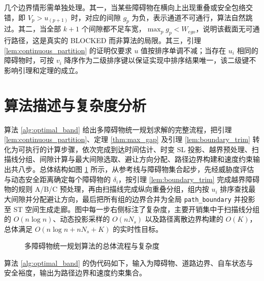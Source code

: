 几个边界情形需单独处理。其一，当某些障碍物在横向上出现重叠或安全包络交错，即 $V_p > u_{(p+1)}$ 时，对应的间隙 $g_p$ 为负，表示通道不可通行，算法自然跳过。其二，当全部 $k+1$ 个间隙都不足车宽，$\max_p g_p < W_{ego}$，说明该截面无可通行路径，这是真实的 BLOCKED 而非算法的局限。其三，引理 \ref{lem:continuous_partition} 的证明仅要求 $u$ 值按排序单调不减；当存在 $u_i$ 相同的障碍物时，可按 $v_i$ 降序作为二级排序键以保证实现中排序结果唯一，该二级键不影响引理和定理的成立。

\section{算法描述与复杂度分析}
算法 \ref{alg:optimal_band} 给出多障碍物统一规划求解的完整流程，把引理 \ref{lem:continuous_partition}、定理 \ref{thm:max_gap} 及引理 \ref{lem:boundary_trim} 转化为可执行的计算步骤，依次完成到达时间估计、时变 SL 投影、越界预处理、扫描线分组、间隙计算与最大间隙选取、避让方向分配、路径边界构建和速度约束输出共八步。总体结构如图 \ref{fig:algorithm_flow} 所示，从参考线与障碍物集合起步，先经威胁度评估与动态安全距离确定每个障碍物的 $\delta_i$，按引理 \ref{lem:boundary_trim} 完成越界障碍物的规则 A/B/C 预处理，再由扫描线完成纵向重叠分组，组内按 $u_i$ 排序查找最大间隙并分配避让方向，最后把所有组的边界合并为全局 \texttt{path\_boundary} 并投影至 ST 空间生成走廊。图中每一步右侧标注了复杂度，主要开销集中于扫描线分组的 $O(n\log n)$、动态投影采样的 $O(nN_s)$ 以及路径离散边界构建的 $O(K)$，总体满足 $O(n\log n + nN_s + K)$ 的实时性目标。

\begin{figure}[htbp]
\centering
{}
\caption{多障碍物统一规划算法的总体流程与复杂度}
\label{fig:algorithm_flow}
\end{figure}

算法 \ref{alg:optimal_band} 的伪代码如下，输入为障碍物、道路边界、自车状态与安全裕度，输出为路径边界和速度约束集合。

